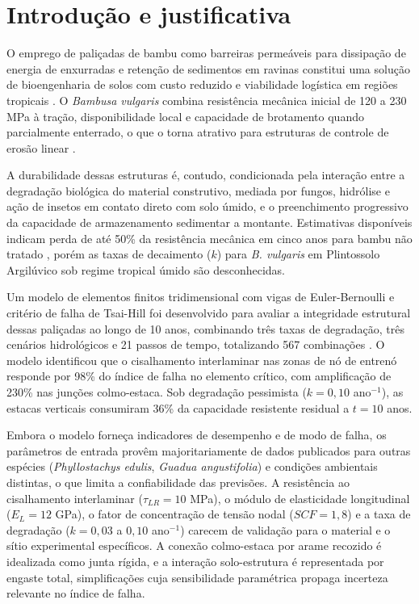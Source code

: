 \documentclass[
  brazilian,
  authoryear,
  preprint]{elsarticle}
\begin{document}
\section{Introdução e
justificativa}\label{introduuxe7uxe3o-e-justificativa}

O emprego de paliçadas de bambu como barreiras permeáveis para
dissipação de energia de enxurradas e retenção de sedimentos em ravinas
constitui uma solução de bioengenharia de solos com custo reduzido e
viabilidade logística em regiões tropicais
\citep{piton_et_al_2017, bombino_et_al_2019}. O \emph{Bambusa vulgaris}
combina resistência mecânica inicial de 120 a 230 MPa à tração,
disponibilidade local e capacidade de brotamento quando parcialmente
enterrado, o que o torna atrativo para estruturas de controle de erosão
linear \citep{huzita_noda_kayo_2020, birnnaum_et_al_2018}.

A durabilidade dessas estruturas é, contudo, condicionada pela interação
entre a degradação biológica do material construtivo, mediada por
fungos, hidrólise e ação de insetos em contato direto com solo úmido, e
o preenchimento progressivo da capacidade de armazenamento sedimentar a
montante. Estimativas disponíveis indicam perda de até 50\% da
resistência mecânica em cinco anos para bambu não tratado
\citep{ghimire_et_al_2013}, porém as taxas de decaimento (\(k\)) para
\emph{B. vulgaris} em Plintossolo Argilúvico sob regime tropical úmido
são desconhecidas.

Um modelo de elementos finitos tridimensional com vigas de
Euler-Bernoulli e critério de falha de Tsai-Hill foi desenvolvido para
avaliar a integridade estrutural dessas paliçadas ao longo de 10 anos,
combinando três taxas de degradação, três cenários hidrológicos e 21
passos de tempo, totalizando 567 combinações
\citep{bacharoudis_philippidis_2015}. O modelo identificou que o
cisalhamento interlaminar nas zonas de nó de entrenó responde por 98\%
do índice de falha no elemento crítico, com amplificação de 230\% nas
junções colmo-estaca. Sob degradação pessimista (\(k = 0{,}10\)
ano\(^{-1}\)), as estacas verticais consumiram 36\% da capacidade
resistente residual a \(t = 10\) anos.

Embora o modelo forneça indicadores de desempenho e de modo de falha, os
parâmetros de entrada provêm majoritariamente de dados publicados para
outras espécies (\emph{Phyllostachys edulis}, \emph{Guadua
angustifolia}) e condições ambientais distintas, o que limita a
confiabilidade das previsões. A resistência ao cisalhamento interlaminar
(\(\tau_{LR} = 10\) MPa), o módulo de elasticidade longitudinal
(\(E_L = 12\) GPa), o fator de concentração de tensão nodal
(\(SCF = 1{,}8\)) e a taxa de degradação (\(k = 0{,}03\) a \(0{,}10\)
ano\(^{-1}\)) carecem de validação para o material e o sítio
experimental específicos. A conexão colmo-estaca por arame recozido é
idealizada como junta rígida, e a interação solo-estrutura é
representada por engaste total, simplificações cuja sensibilidade
paramétrica propaga incerteza relevante no índice de falha.
\end{document}
